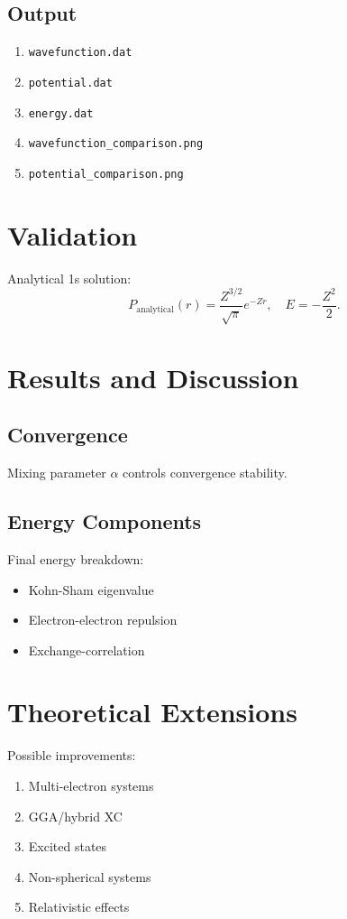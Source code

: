 \documentclass[12pt,a4paper]{article}
\begin{document}
\subsection{Output}
\begin{enumerate}
    \item \texttt{wavefunction.dat}
    \item \texttt{potential.dat}
    \item \texttt{energy.dat}
    \item \texttt{wavefunction\_comparison.png}
    \item \texttt{potential\_comparison.png}
\end{enumerate}

\section{Validation}

Analytical 1s solution:
\[
P_\text{analytical}(r) = \frac{Z^{3/2}}{\sqrt{\pi}} e^{-Zr}, \quad E = -\frac{Z^2}{2}.
\]

\section{Results and Discussion}

\subsection{Convergence}
Mixing parameter $\alpha$ controls convergence stability.

\subsection{Energy Components}
Final energy breakdown:
\begin{itemize}
    \item Kohn-Sham eigenvalue
    \item Electron-electron repulsion
    \item Exchange-correlation
\end{itemize}

\section{Theoretical Extensions}
Possible improvements:
\begin{enumerate}
    \item Multi-electron systems
    \item GGA/hybrid XC
    \item Excited states
    \item Non-spherical systems
    \item Relativistic effects
\end{enumerate}
\end{document}
